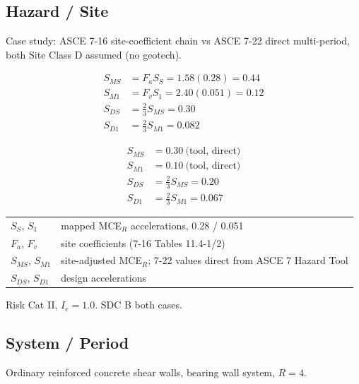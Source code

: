 \documentclass[10pt]{article}
\begin{document}
\newpage
\subsection{Hazard / Site}

Case study: ASCE 7-16 site-coefficient chain vs ASCE 7-22 direct multi-period, both Site Class D assumed (no geotech).

\medskip
\noindent
\begin{minipage}[t]{0.48\linewidth}
\begin{align*}
S_{MS} &= F_a S_S = 1.58(0.28) = 0.44 \\
S_{M1} &= F_v S_1 = 2.40(0.051) = 0.12 \\
S_{DS} &= \tfrac{2}{3} S_{MS} = 0.30 \\
S_{D1} &= \tfrac{2}{3} S_{M1} = 0.082
\end{align*}
\end{minipage}\hfill
\begin{minipage}[t]{0.48\linewidth}
\begin{align*}
S_{MS} &= 0.30 \ \text{(tool, direct)} \\
S_{M1} &= 0.10 \ \text{(tool, direct)} \\
S_{DS} &= \tfrac{2}{3} S_{MS} = 0.20 \\
S_{D1} &= \tfrac{2}{3} S_{M1} = 0.067
\end{align*}
\end{minipage}

{\ttfamily\footnotesize \begin{tabular}{@{}ll@{}}
$S_S$, $S_1$ & mapped MCE$_R$ accelerations, 0.28 / 0.051 \\
$F_a$, $F_v$ & site coefficients (7-16 Tables 11.4-1/2) \\
$S_{MS}$, $S_{M1}$ & site-adjusted MCE$_R$; 7-22 values direct from ASCE 7 Hazard Tool \\
$S_{DS}$, $S_{D1}$ & design accelerations \\
\end{tabular}}

\medskip
Risk Cat II, $I_e = 1.0$. SDC B both cases.

\subsection{System / Period}

Ordinary reinforced concrete shear walls, bearing wall system, $R = 4$.
\end{document}
